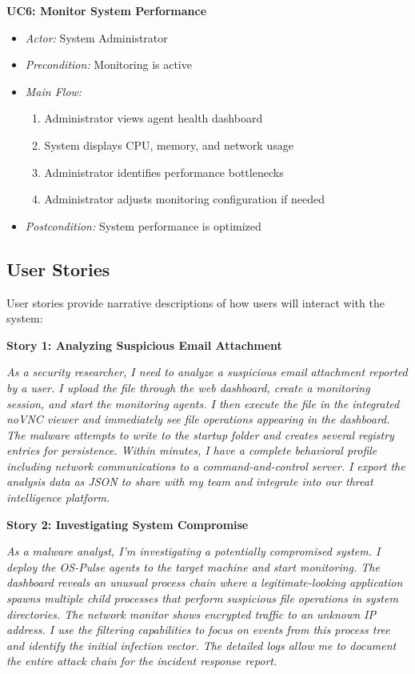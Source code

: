\textbf{UC6: Monitor System Performance}
\begin{itemize}
    \item \textit{Actor:} System Administrator
    \item \textit{Precondition:} Monitoring is active
    \item \textit{Main Flow:}
    \begin{enumerate}
        \item Administrator views agent health dashboard
        \item System displays CPU, memory, and network usage
        \item Administrator identifies performance bottlenecks
        \item Administrator adjusts monitoring configuration if needed
    \end{enumerate}
    \item \textit{Postcondition:} System performance is optimized
\end{itemize}

\subsection{User Stories}

User stories provide narrative descriptions of how users will interact with the system:

\textbf{Story 1: Analyzing Suspicious Email Attachment}

\textit{As a security researcher, I need to analyze a suspicious email attachment reported by a user. I upload the file through the web dashboard, create a monitoring session, and start the monitoring agents. I then execute the file in the integrated noVNC viewer and immediately see file operations appearing in the dashboard. The malware attempts to write to the startup folder and creates several registry entries for persistence. Within minutes, I have a complete behavioral profile including network communications to a command-and-control server. I export the analysis data as JSON to share with my team and integrate into our threat intelligence platform.}

\textbf{Story 2: Investigating System Compromise}

\textit{As a malware analyst, I'm investigating a potentially compromised system. I deploy the OS-Pulse agents to the target machine and start monitoring. The dashboard reveals an unusual process chain where a legitimate-looking application spawns multiple child processes that perform suspicious file operations in system directories. The network monitor shows encrypted traffic to an unknown IP address. I use the filtering capabilities to focus on events from this process tree and identify the initial infection vector. The detailed logs allow me to document the entire attack chain for the incident response report.}

